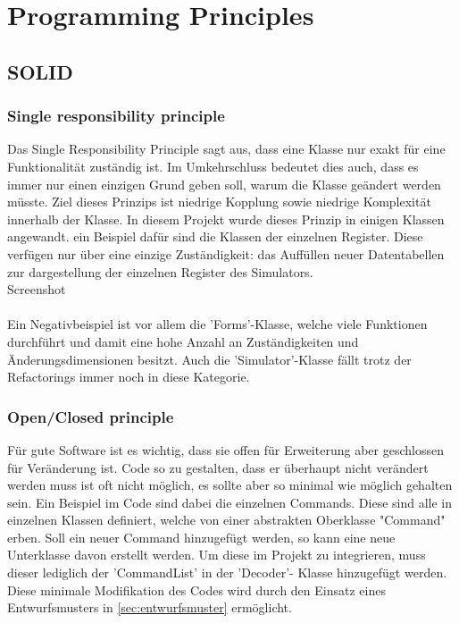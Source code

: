 \documentclass[12pt,a4paper,titlepage,ngerman,pdftex]{report}
\begin{document}
	\section{Programming Principles}
	
	\subsection{SOLID}\label{subsec:solid}
	
	\subsubsection{Single responsibility principle}\label{subsubsec:single_responsibility}
	Das Single Responsibility Principle sagt aus, dass eine Klasse nur exakt für eine Funktionalität zuständig ist. Im Umkehrschluss bedeutet dies auch, dass es immer nur einen einzigen Grund geben soll, warum die Klasse geändert werden müsste.
	Ziel dieses Prinzips ist niedrige Kopplung sowie niedrige Komplexität innerhalb der Klasse. In diesem Projekt wurde dieses Prinzip in einigen Klassen angewandt. ein Beispiel dafür sind die Klassen der einzelnen Register. 
	Diese verfügen nur über eine einzige Zuständigkeit: das Auffüllen neuer Datentabellen zur dargestellung der einzelnen Register des Simulators.
	\\
	Screenshot
	\\
	\\
	Ein Negativbeispiel ist vor allem die 'Forms'-Klasse, welche viele Funktionen durchführt und damit eine hohe Anzahl an Zuständigkeiten und Änderungsdimensionen besitzt. Auch die 'Simulator'-Klasse fällt trotz der Refactorings immer noch in diese Kategorie. 
	
	
	
	\subsubsection{Open/Closed principle}
	Für gute Software ist es wichtig, dass sie offen für Erweiterung aber geschlossen für Veränderung ist. Code so zu gestalten, dass er überhaupt nicht verändert werden muss ist oft nicht möglich, es sollte aber so minimal wie möglich gehalten sein. Ein Beispiel im Code sind dabei die einzelnen Commands.
	Diese sind alle in einzelnen Klassen definiert, welche von einer abstrakten Oberklasse "Command" erben. Soll ein neuer Command hinzugefügt werden, so kann eine neue Unterklasse davon erstellt werden. Um diese im Projekt zu integrieren, muss dieser lediglich der 'CommandList' in der 'Decoder'- Klasse hinzugefügt werden.
	Diese minimale Modifikation des Codes wird durch den Einsatz eines Entwurfsmusters in \autoref{sec:entwurfsmuster} ermöglicht. 
	
\end{document}
